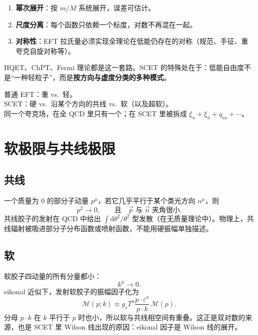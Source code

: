 \documentclass[11pt,a4paper]{article}
\theoremstyle{definition}
\theoremstyle{plain}
\theoremstyle{remark}
\newcommand{\dd}{\mathrm{d}}
\begin{document}
\begin{enumerate}[leftmargin=1.6em]
  \item \textbf{幂次展开}：按 $m/M$ 系统展开，误差可估计。
  \item \textbf{尺度分离}：每个函数只依赖一个标度，对数不再混在一起。
  \item \textbf{对称性}：EFT 拉氏量必须实现全理论在低能仍存在的对称（规范、手征、重夸克自旋对称等）。
\end{enumerate}

HQET、ChPT、Fermi 理论都是这一套路。SCET 的特殊处在于：低能自由度不是``一种轻粒子''，而是\textbf{按方向与虚度分类的多种模式}。

\begin{keybox}
普通 EFT：重 vs.\ 轻。\\
SCET：硬 vs.\ 沿某个方向的共线 vs.\ 软（以及超软）。\\
同一个夸克场，在全 QCD 里只有一个；在 SCET 里被拆成 $\xi_n+\xi_{\bar n}+q_{us}+\cdots$。
\end{keybox}

\section{软极限与共线极限}
\label{sec:limits}

\subsection{共线}

一个质量为 $0$ 的部分子动量 $p^\mu$，若它几乎平行于某个类光方向 $n^\mu$，则
\begin{equation}
  p^2\to 0,\qquad \text{且}\quad \vec p\text{ 与 }\vec n\text{ 夹角很小}.
\end{equation}
共线胶子的发射在 QCD 中给出 $\int \dd\theta^2/\theta^2$ 型发散（在无质量理论中）。物理上，共线辐射被吸进部分子分布函数或喷射函数，不能用硬振幅单独描述。

\subsection{软}

软胶子四动量的所有分量都小：
\begin{equation}
  k^\mu\to 0.
\end{equation}
eikonal 近似下，发射软胶子的振幅因子化为
\begin{equation}
\label{eq:eikonal}
  \mathcal{M}(p;k)\approx g_s T^a\frac{p\cdot\varepsilon^a}{p\cdot k}\,\mathcal{M}(p).
\end{equation}
分母 $p\cdot k$ 在 $k$ 平行于 $p$ 时也小，所以软与共线相空间有重叠。这正是双对数的来源，也是 SCET 里 Wilson 线出现的原因：eikonal 因子是 Wilson 线的展开。
\end{document}
